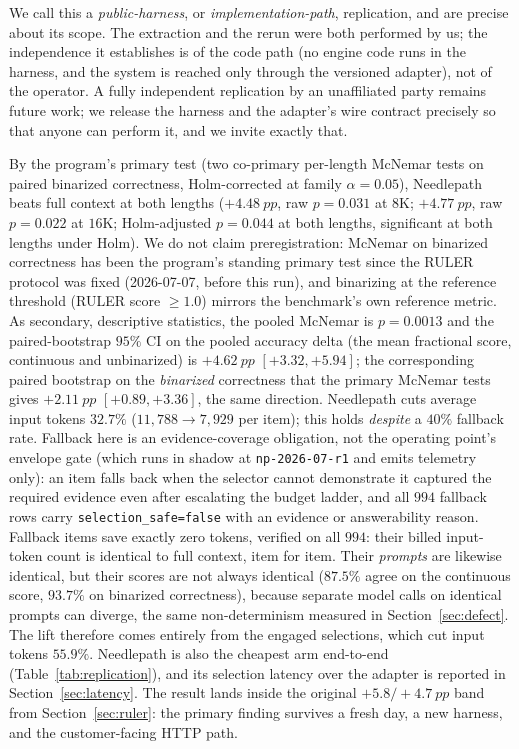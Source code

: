 \documentclass[11pt]{article}
\newcommand{\pp}{~pp}          %
\newcommand{\NP}{Needlepath}
\newcommand{\oppoint}{\texttt{np-2026-07-r1}}
\begin{document}
We call this a \emph{public-harness}, or \emph{implementation-path}, replication, and are precise
about its scope. The extraction and the rerun were both performed by us; the independence it
establishes is of the code path (no engine code runs in the harness, and the system is reached
only through the versioned adapter), not of the operator. A fully independent replication by an
unaffiliated party remains future work; we release the harness and the adapter's wire contract
precisely so that anyone can perform it, and we invite exactly that.

By the program's primary test (two co-primary per-length McNemar tests on paired binarized
correctness, Holm-corrected at family $\alpha{=}0.05$), \NP{} beats full context at both lengths
($+4.48\pp$, raw $p{=}0.031$ at $8$K; $+4.77\pp$, raw $p{=}0.022$ at $16$K; Holm-adjusted $p{=}0.044$ at both lengths, significant at both lengths under Holm).
We do not claim preregistration: McNemar on binarized correctness has been the program's standing
primary test since the RULER protocol was fixed (2026-07-07, before this run), and binarizing at
the reference threshold (RULER score $\ge 1.0$) mirrors the benchmark's own reference metric. As secondary,
descriptive statistics, the pooled McNemar is $p{=}0.0013$ and the paired-bootstrap $95\%$ CI on
the pooled accuracy delta (the mean fractional score, continuous and unbinarized) is
$+4.62\pp$ $[+3.32,+5.94]$; the corresponding paired bootstrap on the \emph{binarized}
correctness that the primary McNemar tests gives $+2.11\pp$ $[+0.89,+3.36]$, the
same direction. \NP{} cuts average input tokens $32.7\%$ ($11{,}788 \to 7{,}929$ per item);
this holds \emph{despite} a $40\%$ fallback rate. Fallback here is an evidence-coverage
obligation, not the operating point's envelope gate (which runs in shadow at \oppoint{} and
emits telemetry only): an item falls back when the selector cannot demonstrate it captured the
required evidence even after escalating the budget ladder, and all $994$ fallback rows carry
\texttt{selection\_safe=false} with an evidence or answerability reason. Fallback items save
exactly zero tokens, verified on all $994$: their billed input-token count is identical to full
context, item for item. Their \emph{prompts} are likewise identical, but their scores are not
always identical ($87.5\%$ agree on the continuous score, $93.7\%$ on binarized correctness),
because separate model calls on identical prompts can diverge, the same non-determinism measured
in Section~\ref{sec:defect}. The lift therefore comes entirely from the engaged selections, which
cut input tokens $55.9\%$. \NP{}
is also the cheapest arm end-to-end (Table~\ref{tab:replication}), and its selection latency over
the adapter is reported in Section~\ref{sec:latency}. The result lands inside the original
$+5.8/+4.7\pp$ band from Section~\ref{sec:ruler}: the primary finding survives a fresh day, a new
harness, and the customer-facing HTTP path.
\end{document}

